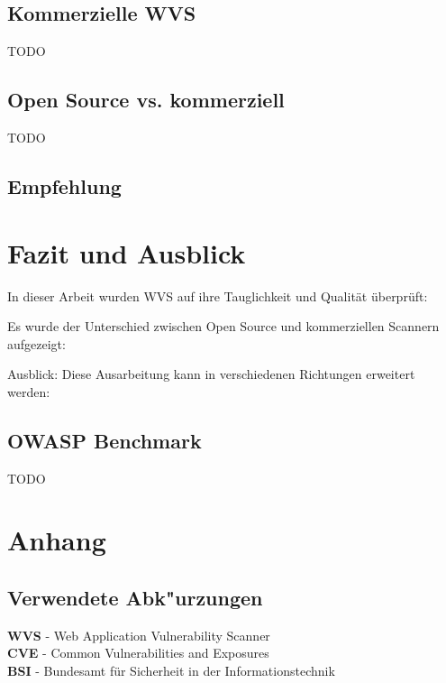 \documentclass[12pt,oneside,a4paper,parskip]{scrbook}
\begin{document}
  \section{Kommerzielle WVS}
  TODO
  \section{Open Source vs. kommerziell}
  TODO
  \section{Empfehlung}


\chapter{Fazit und Ausblick}
In dieser Arbeit wurden WVS auf ihre Tauglichkeit und Qualität überprüft:

Es wurde der Unterschied zwischen Open Source und kommerziellen Scannern aufgezeigt:

Ausblick: Diese Ausarbeitung kann in verschiedenen Richtungen erweitert werden:
  \section{OWASP Benchmark}
  TODO


\backmatter



\cleardoublepage
{}
{}
\printbibliography[title=Quellenverzeichnis]

\appendix
  \chapter{Anhang}

  \section{Verwendete Abk"urzungen}
  \textbf{WVS} - Web Application Vulnerability Scanner\\

  \textbf{CVE} - Common Vulnerabilities and Exposures\\

  \textbf{BSI} - Bundesamt für Sicherheit in der Informationstechnik\\
\end{document}
